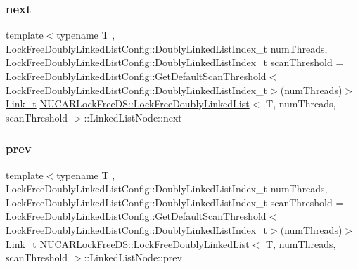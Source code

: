 \subsubsection{\texorpdfstring{next}{next}}
{\footnotesize\ttfamily template$<$typename T , Lock\+Free\+Doubly\+Linked\+List\+Config\+::\+Doubly\+Linked\+List\+Index\+\_\+t num\+Threads, Lock\+Free\+Doubly\+Linked\+List\+Config\+::\+Doubly\+Linked\+List\+Index\+\_\+t scan\+Threshold = Lock\+Free\+Doubly\+Linked\+List\+Config\+::\+Get\+Default\+Scan\+Threshold$<$\+Lock\+Free\+Doubly\+Linked\+List\+Config\+::\+Doubly\+Linked\+List\+Index\+\_\+t$>$(num\+Threads)$>$ \\
\mbox{\hyperlink{class_n_u_c_a_r_lock_free_d_s_1_1_lock_free_doubly_linked_list_a08f21d5e04bc2a02d6c1d8861a6ba0de}{Link\+\_\+t}} \mbox{\hyperlink{class_n_u_c_a_r_lock_free_d_s_1_1_lock_free_doubly_linked_list}{N\+U\+C\+A\+R\+Lock\+Free\+D\+S\+::\+Lock\+Free\+Doubly\+Linked\+List}}$<$ T, num\+Threads, scan\+Threshold $>$\+::Linked\+List\+Node\+::next\hspace{0.3cm}{\ttfamily [private]}}

\mbox{\label{class_n_u_c_a_r_lock_free_d_s_1_1_lock_free_doubly_linked_list_1_1_linked_list_node_ae9d1647c3b7780a17ba51454410263d4}} 
\subsubsection{\texorpdfstring{prev}{prev}}
{\footnotesize\ttfamily template$<$typename T , Lock\+Free\+Doubly\+Linked\+List\+Config\+::\+Doubly\+Linked\+List\+Index\+\_\+t num\+Threads, Lock\+Free\+Doubly\+Linked\+List\+Config\+::\+Doubly\+Linked\+List\+Index\+\_\+t scan\+Threshold = Lock\+Free\+Doubly\+Linked\+List\+Config\+::\+Get\+Default\+Scan\+Threshold$<$\+Lock\+Free\+Doubly\+Linked\+List\+Config\+::\+Doubly\+Linked\+List\+Index\+\_\+t$>$(num\+Threads)$>$ \\
\mbox{\hyperlink{class_n_u_c_a_r_lock_free_d_s_1_1_lock_free_doubly_linked_list_a08f21d5e04bc2a02d6c1d8861a6ba0de}{Link\+\_\+t}} \mbox{\hyperlink{class_n_u_c_a_r_lock_free_d_s_1_1_lock_free_doubly_linked_list}{N\+U\+C\+A\+R\+Lock\+Free\+D\+S\+::\+Lock\+Free\+Doubly\+Linked\+List}}$<$ T, num\+Threads, scan\+Threshold $>$\+::Linked\+List\+Node\+::prev\hspace{0.3cm}{\ttfamily [private]}}

